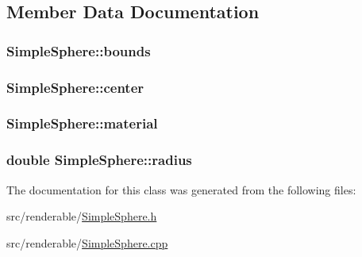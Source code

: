 \subsection{Member Data Documentation}
\subsubsection[{\texorpdfstring{bounds}{bounds}}]{ Simple\+Sphere\+::bounds\hspace{0.3cm}{\ttfamily [private]}}\hypertarget{classSimpleSphere_a9e528c29b08c4b70c8b707343576ec57}{}\label{classSimpleSphere_a9e528c29b08c4b70c8b707343576ec57}
\subsubsection[{\texorpdfstring{center}{center}}]{ Simple\+Sphere\+::center\hspace{0.3cm}{\ttfamily [private]}}\hypertarget{classSimpleSphere_af432089b8146295c77f52f22835bf1ab}{}\label{classSimpleSphere_af432089b8146295c77f52f22835bf1ab}
\subsubsection[{\texorpdfstring{material}{material}}]{ Simple\+Sphere\+::material\hspace{0.3cm}{\ttfamily [private]}}\hypertarget{classSimpleSphere_abfb049ac4dabb0c7fbb78d7791e33e42}{}\label{classSimpleSphere_abfb049ac4dabb0c7fbb78d7791e33e42}
\subsubsection[{\texorpdfstring{radius}{radius}}]{\setlength{\rightskip}{0pt plus 5cm}double Simple\+Sphere\+::radius\hspace{0.3cm}{\ttfamily [private]}}\hypertarget{classSimpleSphere_ad69dbac136ee99110f41b7b84656b144}{}\label{classSimpleSphere_ad69dbac136ee99110f41b7b84656b144}


The documentation for this class was generated from the following files\+:\begin{DoxyCompactItemize}
\item 
src/renderable/\hyperlink{SimpleSphere_8h}{Simple\+Sphere.\+h}\item 
src/renderable/\hyperlink{SimpleSphere_8cpp}{Simple\+Sphere.\+cpp}\end{DoxyCompactItemize}
